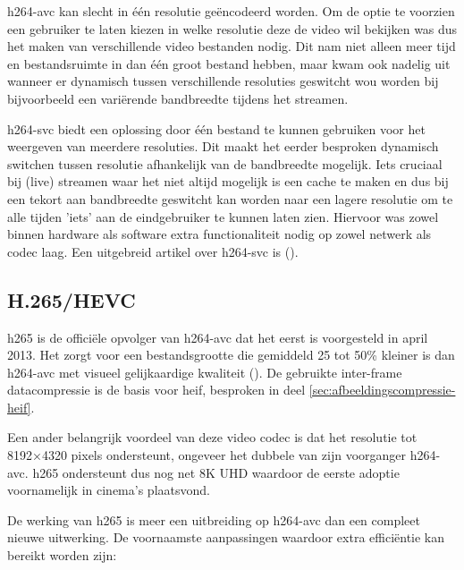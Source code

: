 \Gls{h264-avc} kan slecht in één resolutie geëncodeerd worden. Om de optie te voorzien een gebruiker te laten kiezen in welke resolutie deze de video wil bekijken was dus het maken van verschillende video bestanden nodig. Dit nam niet alleen meer tijd en bestandsruimte in dan één groot bestand hebben, maar kwam ook nadelig uit wanneer er dynamisch tussen verschillende resoluties geswitcht wou worden bij bijvoorbeeld een variërende \gls{bandbreedte} tijdens het streamen.

\Gls{h264-svc} biedt een oplossing door één bestand te kunnen gebruiken voor het weergeven van meerdere resoluties. Dit maakt het eerder besproken dynamisch switchen tussen resolutie afhankelijk van de \gls{bandbreedte} mogelijk. Iets cruciaal bij (live) streamen waar het niet altijd mogelijk is een cache te maken en dus bij een tekort aan \gls{bandbreedte} geswitcht kan worden naar een lagere resolutie om te alle tijden 'iets' aan de eindgebruiker te kunnen laten zien. Hiervoor was zowel binnen hardware als software extra functionaliteit nodig op zowel netwerk als \gls{codec} laag. Een uitgebreid artikel over \gls{h264-svc} is  (\cite{H264svcoverview}).


\subsection{H.265/HEVC}
\label{sec:videocompressie-h265}

\Gls{h265} is de officiële opvolger van \gls{h264-avc} dat het eerst is voorgesteld in april 2013. Het zorgt voor een bestandsgrootte die gemiddeld 25 tot 50\% kleiner is dan \gls{h264-avc} met visueel gelijkaardige kwaliteit (\cite{h262h264h265vergelijking}). De gebruikte \gls{inter-frame} \gls{datacompressie} is de basis voor \gls{heif}, besproken in deel \ref{sec:afbeeldingscompressie-heif}.

Een ander belangrijk voordeel van deze video \gls{codec} is dat het resolutie tot 8192×4320 \glspl{pixel} ondersteunt, ongeveer het dubbele van zijn voorganger \gls{h264-avc}. \Gls{h265} ondersteunt dus nog net 8K UHD waardoor de eerste adoptie voornamelijk in cinema's plaatsvond.

De werking van \gls{h265} is meer een uitbreiding op \gls{h264-avc} dan een compleet nieuwe uitwerking. De voornaamste aanpassingen waardoor extra efficiëntie kan bereikt worden zijn:

